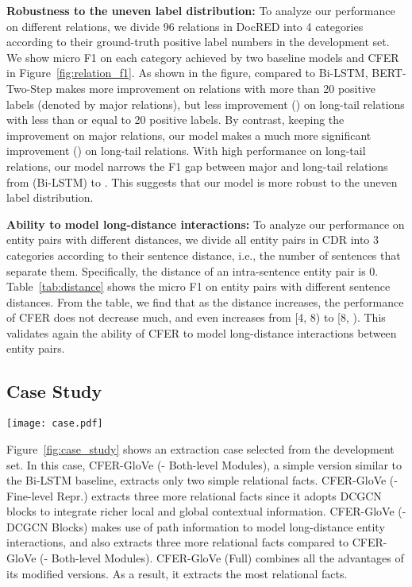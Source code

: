 \documentclass{article}
\begin{document}
\noindent\textbf{Robustness to the uneven label distribution: }
To analyze our performance on different relations, we divide 96 relations in DocRED into 4 categories according to their ground-truth positive label numbers in the development set. 
We show micro F1 on each category achieved by two baseline models and CFER in Figure~\ref{fig:relation_f1}. 
As shown in the figure, compared to Bi-LSTM, BERT-Two-Step makes more improvement on relations with more than 20 positive labels (denoted by major relations), but less improvement () on long-tail relations with less than or equal to 20 positive labels. 
By contrast, keeping the improvement on major relations, our model makes a much more significant improvement () on long-tail relations. 
With high performance on long-tail relations, our model narrows the F1 gap between major and long-tail relations from  (Bi-LSTM) to . 
This suggests that our model is more robust to the uneven label distribution.

\noindent\textbf{Ability to model long-distance interactions: }
To analyze our performance on entity pairs with different distances, we divide all entity pairs in CDR into 3 categories according to their sentence distance, i.e., the number of sentences that separate them. 
Specifically, the distance of an intra-sentence entity pair is 0. 
Table~\ref{tab:distance} shows the micro F1 on entity pairs with different sentence distances. 
From the table, we find that as the distance increases, the performance of CFER does not decrease much, and even increases from [4, 8) to [8, ). 
This validates again the ability of CFER to model long-distance interactions between entity pairs. 

\subsection{Case Study}

\begin{figure*}[ht]
\centering
\texttt{[image: case.pdf]}
\caption{
An extraction case from the development set. 
We show the relational facts extracted by four versions of CFER-GloVe. 
For CFER-GloVe (Full) and CFER-GloVe (- DCGCN Blocks), we additionally show the paths along with their attention weights used for producing fine-level representations of entity 0 (Daniel Ajayi Adeniran) and entity 5 (Redeemed Christian Church). 
}
\label{fig:case_study}
\end{figure*}

Figure~\ref{fig:case_study} shows an extraction case selected from the development set. 
In this case, CFER-GloVe (- Both-level Modules), a simple version similar to the Bi-LSTM baseline, extracts only two simple relational facts. 
CFER-GloVe (- Fine-level Repr.) extracts three more relational facts since it adopts DCGCN blocks to integrate richer local and global contextual information. 
CFER-GloVe (- DCGCN Blocks) makes use of path information to model long-distance entity interactions, and also extracts three more relational facts compared to CFER-GloVe (- Both-level Modules). 
CFER-GloVe (Full) combines all the advantages of its modified versions. 
As a result, it extracts the most relational facts. 
\end{document}
